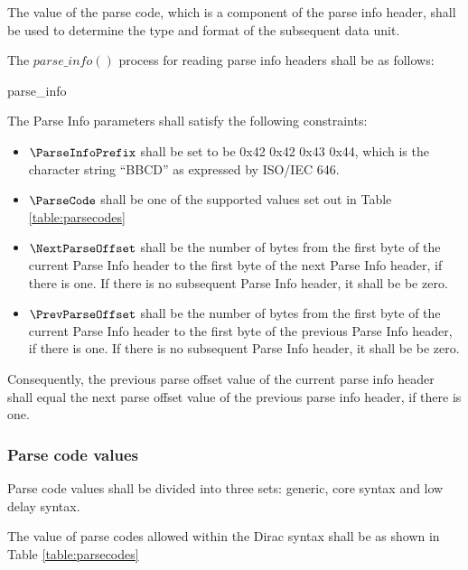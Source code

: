 The value of the parse code, which is a component of the parse info header,
shall be used to determine the type and format of the subsequent data unit.

The $parse\_info()$ process for reading parse info headers shall be as follows:

\begin{pseudo}{parse\_info}{}
\end{pseudo}

The Parse Info parameters shall satisfy the following constraints:

\begin{itemize}
\item $\ParseInfoPrefix$ shall be set to be 0x42 0x42 0x43 0x44, which is the character string ``BBCD'' as expressed by ISO/IEC 646.
\item $\ParseCode$ shall be one of the supported values set out 
in Table \ref{table:parsecodes}
\item $\NextParseOffset$ shall be the number of bytes from the first byte of the current
Parse Info header to the first byte of the next Parse Info header, if there is one. If there
is no subsequent Parse Info header, it shall be be zero.
\item $\PrevParseOffset$ shall be the number of bytes from the first byte of the current
Parse Info header to the first byte of the previous Parse Info header, if there is one. If there
is no subsequent Parse Info header, it shall be be zero.
\end{itemize}

Consequently, the previous parse offset value of the current parse info header shall equal the next parse offset value of the previous parse info header, if there is one.

\subsubsection{Parse code values}
\label{parsecodevalues}

Parse code values shall be divided into three sets: generic, 
core syntax and low delay
syntax.

The value of parse codes allowed within the Dirac syntax shall 
be as shown in Table \ref{table:parsecodes}

